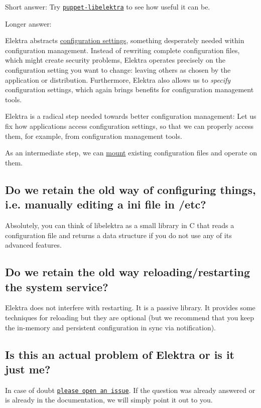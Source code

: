 Short answer\+: Try \href{https://puppet.libelektra.org}{\tt puppet-\/libelektra} to see how useful it can be.

Longer answer\+:

Elektra abstracts \hyperlink{doc_help_elektra-glossary_md}{configuration settings}, something desperately needed within configuration management. Instead of rewriting complete configuration files, which might create security problems, Elektra operates precisely on the configuration setting you want to change\+: leaving others as chosen by the application or distribution. Furthermore, Elektra also allows us to {\itshape specify} configuration settings, which again brings benefits for configuration management tools.

Elektra is a radical step needed towards better configuration management\+: Let us fix how applications access configuration settings, so that we can properly access them, for example, from configuration management tools.

As an intermediate step, we can \hyperlink{doc_help_elektra-mounting_md}{mount} existing configuration files and operate on them.

\subsection*{Do we retain the old way of configuring things, i.\+e. manually editing a ini file in /etc?}

Absolutely, you can think of libelektra as a small library in C that reads a configuration file and returns a data structure if you do not use any of its advanced features.

\subsection*{Do we retain the old way reloading/restarting the system service?}

Elektra does not interfere with restarting. It is a passive library. It provides some techniques for reloading but they are optional (but we recommend that you keep the in-\/memory and persistent configuration in sync via notification).

\subsection*{Is this an actual problem of Elektra or is it just me?}

In case of doubt \href{https://git.libelektra.org/issues}{\tt please open an issue}. If the question was already answered or is already in the documentation, we will simply point it out to you.

